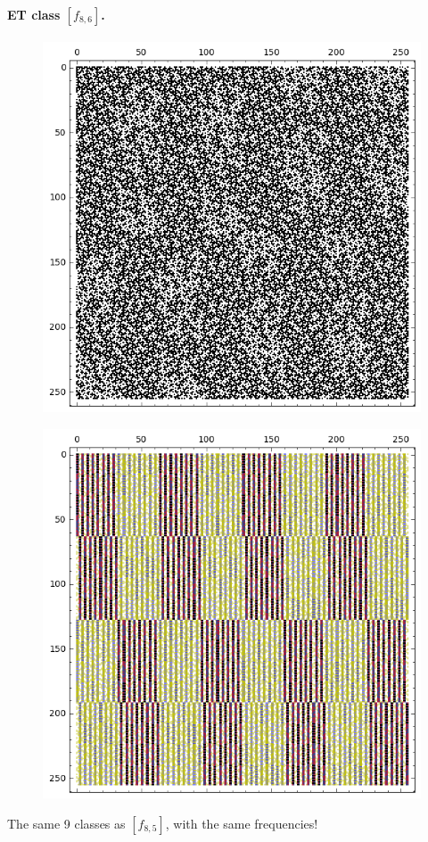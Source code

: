 \documentclass[12pt,a4paper]{article}
\begin{document}
\paragraph*{ET class $[f_{8,6}]$.}
\begin{figure}[!hb]
\centering
\begin{minipage}{.48\textwidth}
  \centering
  \includegraphics[width=.9\linewidth]{../matrix_plot/re8_6_weight_class_matrix.png}
  \label{fig:8_6_weight_class_matrix}
\end{minipage}%
\begin{minipage}{.48\textwidth}
  \centering
  \includegraphics[width=.9\linewidth]{../matrix_plot/re8_6_bent_cayley_graph_index_matrix.png}
  \label{fig:8_6_bent_cayley_graph_index_matrix}
\end{minipage}
\end{figure}
The same 9 classes as $[f_{8,5}]$, with the same frequencies!
\end{document}
